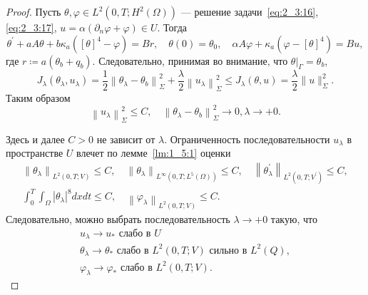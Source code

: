 \begin{proof}
    Пусть $\theta, \varphi \in L^{2}\left(0, T ; H^{2}(\Omega)\right)$
    — решение задачи~\eqref{eq:2_3:16},\eqref{eq:2_3:17},
    $u=\alpha\left(\partial_{n} \varphi+\varphi\right) \in U$.
    Тогда
    \[
        \theta^{\prime}+a A \theta+b \kappa_{a}\left([\theta]^{4}-\varphi\right)=B r,
        \quad \theta(0)=\theta_{0}, \quad \alpha A \varphi
        + \kappa_{a}\left(\varphi-[\theta]^{4}\right)=B u,
    \]
    где $r\coloneqq a\left(\theta_{b}+q_{b}\right)$.
    Следовательно, принимая во внимание,
    что $\left.\theta\right|_{\Gamma}=\theta_{b}$,
    \[
        J_{\lambda}\left(\theta_{\lambda},
        u_{\lambda}\right)=\frac{1}{2}\left\|\theta_{\lambda}-\theta_{b}\right\|_{\Sigma}^{2}
        +\frac{\lambda}{2}\left\|u_{\lambda}\right\|_{\Sigma}^{2}
        \leq J_{\lambda}(\theta, u)=\frac{\lambda}{2}\|u\|_{\Sigma}^{2}.
    \]
    Таким образом
    \[
        \left\|u_{\lambda}\right\|_{\Sigma}^{2} \leq C, \quad\left\|\theta_{\lambda}
        -\theta_{b}\right\|_{\Sigma}^{2} \rightarrow 0, \lambda \rightarrow+0.
    \]


    Здесь и далее $C>0$ не зависит от $\lambda$.
    Ограниченность последовательности $u_{\lambda}$
    в пространстве $U$ влечет по лемме~\ref{lm:1_5:1} оценки
    \[
        \begin{gathered}
            \left\|\theta_{\lambda}\right\|_{L^{2}(0, T ; V)} \leq C,
            \quad\left\|\theta_{\lambda}\right\|_{L^{\infty}
            \left(0, T ; L^{5}(\Omega)\right)} \leq C,
            \quad\left\|\theta_{\lambda}^{\prime}\right\|_{L^{2}
            \left(0, T ; V^{\prime}\right)} \leq C, \\
            \int_{0}^{T} \int_{\Omega}
            \left|\theta_{\lambda}\right|^{8} d x d t \leq C,
            \quad\left\|\varphi_{\lambda}\right\|_{L^{2}(0, T ; V)} \leq C.
        \end{gathered}
    \]
    Следовательно, можно выбрать последовательность $\lambda\rightarrow+0$ такую, что
    \[
        \begin{gathered}
            u_{\lambda} \rightarrow u_{*} \text { слабо в } U \\
            \theta_{\lambda} \rightarrow \theta_{*}
            \text { слабо в } L^{2}(0, T; V) \text { сильно в } L^{2}(Q), \\
            \varphi_{\lambda} \rightarrow \varphi_{*}
            \text { слабо в } L^{2}(0, T; V).
        \end{gathered}
    \]


\end{proof}

